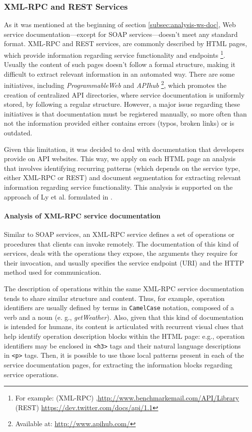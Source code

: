 \subsubsection{XML-RPC and REST Services}
\label{subsubsec:rpc-rest}
As it was mentioned at the beginning of section \ref{subsec:analysis-ws-doc}, Web service documentation---except for SOAP services---doesn't meet
any standard format. XML-RPC and REST services, are commonly described by HTML pages, which provide information regarding service functionality and endpoints \footnote{For example: (XML-RPC) ,\href{http://www.benchmarkemail.com/API/Library}{http://www.benchmarkemail.com/API/Library} (REST) \href{https://dev.twitter.com/docs/api/1.1}{https://dev.twitter.com/docs/api/1.1}}. Usually the content of such pages doesn't follow a formal structure, making it difficult to extract relevant information in an automated way. There are some initiatives, including \emph{ProgrammableWeb} and
\emph{APIhub} \footnote{Available at: \href{http://www.apihub.com/}{http://www.apihub.com/}}, which promotes the creation of centralized API directories, where service documentation is uniformly stored, by following a regular structure. However, a major issue regarding these initiatives is that documentation must be registered manually, so more often than not the information provided either contains errors (typos, broken links) or is outdated.

Given this limitation, it was decided to deal with documentation that developers provide on API websites. This way, we apply on each HTML page an analysis that involves identifying recurring patterns (which depends on the service type, either XML-RPC or REST) and document segmentation for extracting relevant information regarding service functionality. This analysis is supported on the approach of Ly et al. formulated in \cite{Ly:2012}.

\paragraph{Analysis of XML-RPC service documentation}
\label{parag:rpc}
Similar to SOAP services, an XML-RPC service defines a set of operations or procedures that clients can invoke remotely. The documentation of this kind of services, deals with the operations they expose, the arguments they require for their invocation, and usually specifies the service endpoint (URI) and the HTTP method used for communication.

The description of operations within the same XML-RPC service documentation tends to share similar structure and content. Thus, for example, operation identifiers are usually defined by terms in \texttt{CamelCase} notation, composed of a verb and a noun (e. g., \emph{getWeather}). Also, given that this kind of documentation is intended for humans, its content is articulated with recurrent visual clues that help identify operation description blocks within the HTML page: e.g., operation identifiers may be enclosed in \texttt{<h3>} tags and their natural language descriptions\emph{ }in \texttt{<p>} tags. Then, it is possible to use those local patterns present in each of the service documentation pages, for extracting the information blocks regarding service operations. 

